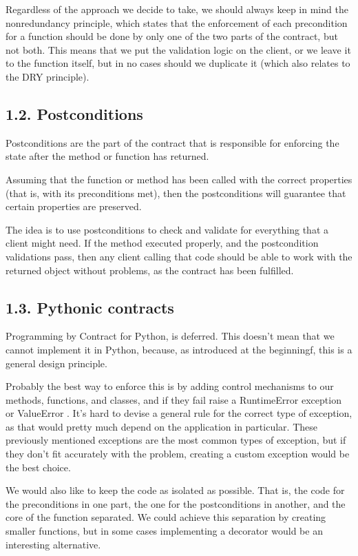 \documentclass[a4paper,10pt,english]{sphinxmanual}
\begin{document}
Regardless of the approach we decide to take, we should always keep in mind the non\sphinxhyphen{}redundancy principle,
which states that the enforcement of each precondition for a function should be done by only one of the two
parts of the contract, but not both. This means that we put the validation logic on the client, or we leave it
to the function itself, but in no cases should we duplicate it (which also relates to the DRY principle).


\subsection{1.2. Postconditions}
\label{\detokenize{chapters/3_general_traits/index:postconditions}}
Postconditions are the part of the contract that is responsible for enforcing the state after the method or
function has returned.

Assuming that the function or method has been called with the correct properties (that is, with its
preconditions met), then the postconditions will guarantee that certain properties are preserved.

The idea is to use postconditions to check and validate for everything that a client might need. If the method
executed properly, and the postcondition validations pass, then any client calling that code should be able to
work with the returned object without problems, as the contract has been fulfilled.


\subsection{1.3. Pythonic contracts}
\label{\detokenize{chapters/3_general_traits/index:pythonic-contracts}}
Programming by Contract for Python, is deferred. This doesn’t mean that we cannot implement it in Python,
because, as introduced at the beginningf, this is a general design principle.

Probably the best way to enforce this is by adding control mechanisms to our methods, functions, and classes,
and if they fail raise a RuntimeError exception or ValueError . It’s hard to devise a general rule for the
correct type of exception, as that would pretty much depend on the application in particular. These previously
mentioned exceptions are the most common types of exception, but if they don’t fit accurately with the
problem, creating a custom exception would be the best choice.

We would also like to keep the code as isolated as possible. That is, the code for the preconditions in one
part, the one for the postconditions in another, and the core of the function separated. We could achieve this
separation by creating smaller functions, but in some cases implementing a decorator would be an interesting
alternative.
\end{document}
